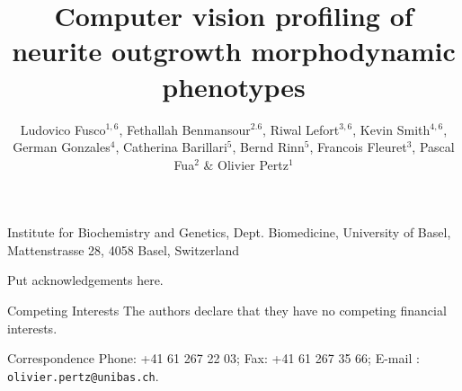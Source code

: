 \documentclass{nature}
\title{Computer vision profiling of neurite outgrowth morphodynamic phenotypes}
\author{Ludovico Fusco$^{1,6}$, Fethallah Benmansour$^{2. 6}$, Riwal Lefort$^{3, 6}$, Kevin Smith$^{4, 6}$, German Gonzales$^4$,  Catherina Barillari$^5$, Bernd Rinn$^5$, Francois Fleuret$^3$, Pascal Fua$^2$  \& Olivier Pertz$^1$}
\begin{document}
\maketitle

\begin{affiliations}
 \item Institute for Biochemistry and Genetics, Dept. Biomedicine, University of Basel, Mattenstrasse 28, 4058 Basel, Switzerland
 \item 
 \item 
 \item 
 \item 
 \item 
\end{affiliations}





\begin{results}







\end{results}




%
%


\begin{addendum}
 \item Put acknowledgements here.
 \item[Competing Interests] The authors declare that they have no
competing financial interests.
 \item[Correspondence] Phone: +41 61 267 22 03; Fax: +41 61 267 35 66; E-mail : \texttt{olivier.pertz@unibas.ch}.
\end{addendum}

\end{document}
